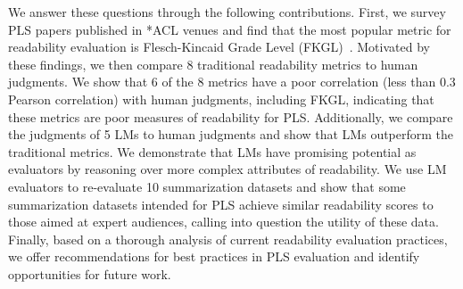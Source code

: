 We answer these questions through the following contributions. First, we survey PLS papers published in *ACL venues and find that the most popular metric for readability evaluation is Flesch-Kincaid Grade Level (FKGL)~\cite{flesch1952simplification}. Motivated by these findings, we then compare 8 traditional readability metrics to human judgments. We show that 6 of the 8 metrics have a poor correlation (less than 0.3 Pearson correlation) with human judgments, including FKGL, indicating that these metrics are poor measures of readability for PLS. Additionally, we compare the judgments of 5 LMs to human judgments and show that LMs outperform the traditional metrics. We demonstrate that LMs have promising potential as evaluators by reasoning over more complex attributes of readability. We use LM evaluators to re-evaluate 10 summarization datasets and show that some summarization datasets intended for PLS achieve similar readability scores to those aimed at expert audiences, calling into question the utility of these data. Finally, based on a thorough analysis of current readability evaluation practices, we offer recommendations for best practices in PLS evaluation and identify opportunities for future work. 



